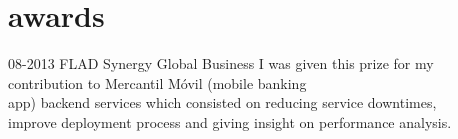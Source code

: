\documentclass[]{friggeri-cv}
\begin{document}
\section{awards}

\begin{entrylist}
  \entry
    {\small 08-2013}
    {FLAD}
    {Synergy Global Business}
    {I was given this prize for my contribution to Mercantil Móvil (mobile banking\\
     app) backend services which consisted on reducing service downtimes,\\
     improve deployment process and giving insight on performance analysis.}
\end{entrylist}
\end{document}
